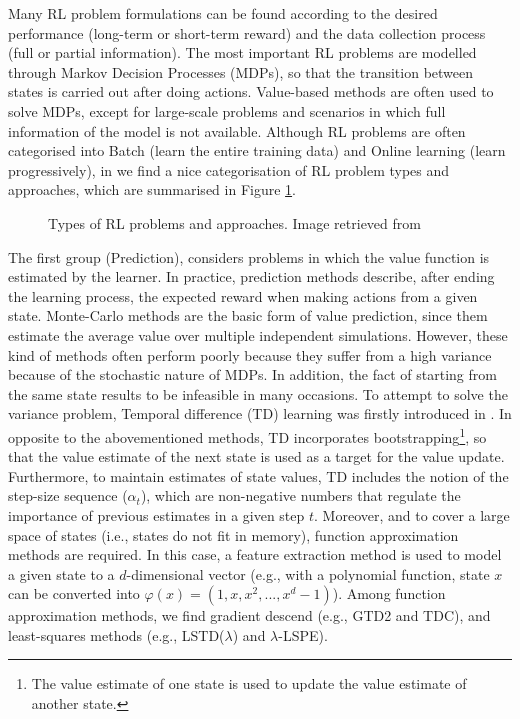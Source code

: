 \documentclass[12pt, a4paper,twoside]{tesi_upf}
\begin{document}
			Many RL problem formulations can be found according to the desired performance (long-term or short-term reward) and the data collection process (full or partial information). The most important RL problems are modelled through Markov Decision Processes (MDPs), so that the transition between states is carried out after doing actions. Value-based methods are often used to solve MDPs, except for large-scale problems and scenarios in which full information of the model is not available. Although RL problems are often categorised into Batch (learn the entire training data) and Online learning (learn progressively), in \cite{szepesvari2010algorithms} we find a nice categorisation of RL problem types and approaches, which are summarised in Figure \ref{fig:rl_types}.			
			\begin{figure}[h!]
				\centering
				\caption{Types of RL problems and approaches. Image retrieved from \cite{szepesvari2010algorithms}}
				\label{fig:rl_types}
			\end{figure}
					
			The first group (Prediction), considers problems in which the value function is estimated by the learner. In practice, prediction methods describe, after ending the learning process, the expected reward when making actions from a given state. Monte-Carlo methods \cite{robert2004monte} are the basic form of value prediction, since them estimate the average value over multiple independent simulations. However, these kind of methods often perform poorly because they suffer from a high variance because of the stochastic nature of MDPs. In addition, the fact of starting from the same state results to be infeasible in many occasions. To attempt to solve the variance problem, Temporal difference (TD) learning was firstly introduced in \cite{sutton1988learning}. In opposite to the abovementioned methods, TD incorporates bootstrapping\footnote{The value estimate of one state is used to update the value estimate of another state.}, so that the value estimate of the next state is used as a target for the value update. Furthermore, to maintain estimates of state values, TD includes the notion of the step-size sequence ($\alpha_t$), which are non-negative numbers that regulate the importance of previous estimates in a given step $t$. Moreover, and to cover a large space of states (i.e., states do not fit in memory), function approximation methods are required. In this case, a feature extraction method is used to model a given state to a $d$-dimensional vector (e.g., with a polynomial function, state $x$ can be converted into $\varphi(x) = (1, x, x^2, ..., x^d-1)$). Among function approximation methods, we find gradient descend (e.g., GTD2 and TDC), and least-squares methods (e.g., LSTD($\lambda$) and $\lambda$-LSPE).
					
\end{document}
